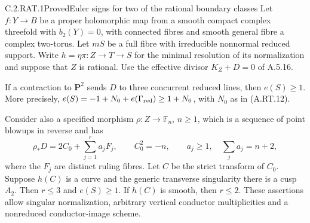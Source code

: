 \begin{statement}{C.2.RAT.1}{Proved}{Euler signs for two of the rational boundary classes}
Let $f:Y\to B$ be a proper holomorphic map from a smooth compact
complex threefold with $b_2(Y)=0$, with connected fibres and smooth
general fibre a complex two-torus. Let $mS$ be a full fibre with
irreducible nonnormal reduced support. Write
$h=\eta\pi:Z\to T\to S$ for the minimal resolution of its
normalization and suppose that $Z$ is rational. Use the effective
divisor $K_Z+D=0$ of A.5.16.

If a contraction to $\mathbf P^2$ sends $D$ to three concurrent
reduced lines, then $e(S)\ge1$. More precisely,
$e(S)=-1+N_0+e(\Gamma_{\rm red})\ge1+N_0$, with $N_0$ as in
(A.RT.12).

Consider also a specified morphism $\rho:Z\to\mathbb F_n$,
$n\ge1$, which is a sequence of point blowups in reverse and has
\[
 \rho_*D=2C_0+\sum_{j=1}^r a_jF_j,\qquad
 C_0^2=-n,\qquad
 a_j\ge1,\quad \sum_j a_j=n+2,                  \tag{C.RA.1}
\]
where the $F_j$ are distinct ruling fibres. Let $C$ be the
strict transform of $C_0$. Suppose $h(C)$ is a curve and the
generic transverse singularity there is a cusp $A_2$.
Then $r\le3$ and $e(S)\ge1$. If $h(C)$ is smooth, then
$r\le2$. These assertions allow singular normalization,
arbitrary vertical conductor multiplicities and a nonreduced
conductor-image scheme.
\end{statement}
